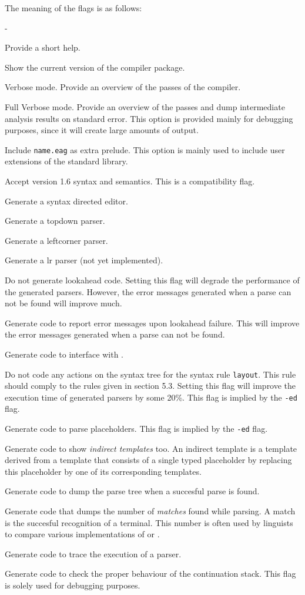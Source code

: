 The meaning of the flags is as follows:
\begin {list}{-}{}
\item [{\tt -h}] Provide a short help.
\item [{\tt -V}] Show the current version of the compiler package.
\item [{\tt -v}] Verbose mode. Provide an overview of the passes
of the compiler.
\item [{\tt -fv}] Full Verbose mode. Provide an overview of the passes
and dump intermediate analysis results on standard error. This option
is provided mainly for debugging purposes, since it will create
large amounts of output.
\item [{\tt -p name}] Include {\tt name.eag} as extra prelude.
This option is mainly used to include user extensions of the
standard library.
\item [{\tt -v1}] Accept \EAG version 1.6 syntax and semantics.
This is a compatibility flag.
\item [{\tt -ed}] Generate a syntax directed editor.
\item [{\tt -td}] Generate a topdown parser.
\item [{\tt -lc}] Generate a leftcorner parser.
\item [{\tt -lr}] Generate a lr parser (not yet implemented).
\item [{\tt -nl}] Do not generate lookahead code. Setting this flag
will degrade the performance of the generated parsers. However, the
error messages generated when a parse can not be found will improve
much.
\item [{\tt -gl}] Generate code to report error messages upon
lookahead failure. This will improve the error messages generated
when a parse can not be found.
\item [{\tt -ic}] Generate code to interface with \Cns.
\item [{\tt -il}] Do not code any actions on the syntax tree for the
syntax rule {\tt layout}. This rule should comply to the rules
given in section 5.3. Setting this flag will improve the execution
time of generated parsers by some 20\%. This flag is implied by the
{\tt -ed} flag.
\item [{\tt -pp}] Generate code to parse placeholders. This flag is
implied by the {\tt -ed} flag.
\item [{\tt -it}] Generate code to show {\em indirect templates} too. An
indirect template is a template derived from a template that consists
of a single typed placeholder by replacing this placeholder by one
of its corresponding templates.
\item [{\tt -D}] Generate code to dump the parse tree when a
succesful parse is found.
\item [{\tt -M}] Generate code that dumps the number of {\em matches}
found while parsing. A match is the succesful recognition of a terminal.
This number is often used by linguists to compare various implementations
of \EAG or \AGFLns.
\item [{\tt -T}] Generate code to trace the execution of a parser.
\item [{\tt -qc}] Generate code to check the proper behaviour
of the continuation stack. This flag is solely used for debugging
purposes.
\end {list}
